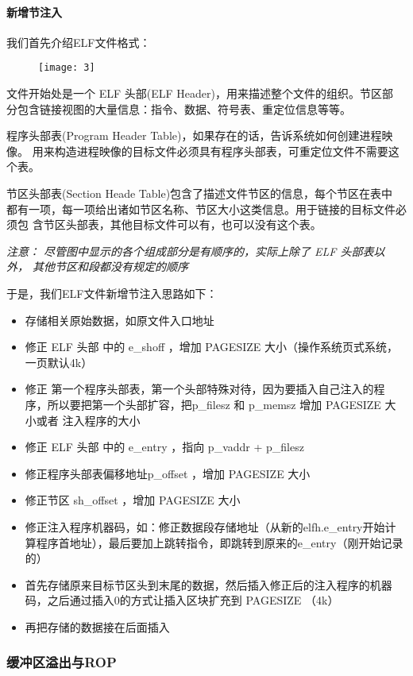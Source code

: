 \documentclass{whureport}
\begin{document}
\paragraph{新增节注入}
我们首先介绍ELF文件格式：

\begin{figure}[H]
\centering
\texttt{[image: 3]}
\end{figure}

文件开始处是一个 ELF 头部(ELF Header)，用来描述整个文件的组织。节区部 分包含链接视图的大量信息：指令、数据、符号表、重定位信息等等。

程序头部表(Program Header Table)，如果存在的话，告诉系统如何创建进程映像。 用来构造进程映像的目标文件必须具有程序头部表，可重定位文件不需要这个表。

节区头部表(Section Heade Table)包含了描述文件节区的信息，每个节区在表中 都有一项，每一项给出诸如节区名称、节区大小这类信息。用于链接的目标文件必须包 含节区头部表，其他目标文件可以有，也可以没有这个表。

\textit{注意： 尽管图中显示的各个组成部分是有顺序的，实际上除了 ELF 头部表以外， 其他节区和段都没有规定的顺序}


于是，我们ELF文件新增节注入思路如下：
\begin{itemize}
  \item 存储相关原始数据，如原文件入口地址
  \item 修正 ELF 头部 中的 e\_shoff ，增加 PAGESIZE 大小（操作系统页式系统，一页默认4k）
  \item 修正 第一个程序头部表，第一个头部特殊对待，因为要插入自己注入的程序，所以要把第一个头部扩容，把p\_filesz 和 p\_memsz 增加 PAGESIZE 大小或者 注入程序的大小
  \item 修正 ELF 头部 中的 e\_entry ，指向 p\_vaddr + p\_filesz
  \item 修正程序头部表偏移地址p\_offset ，增加 PAGESIZE 大小
  \item 修正节区 sh\_offset ，增加 PAGESIZE 大小
  \item 修正注入程序机器码，如：修正数据段存储地址（从新的elfh.e\_entry开始计算程序首地址），最后要加上跳转指令，即跳转到原来的e\_entry（刚开始记录的）
  \item 首先存储原来目标节区头到末尾的数据，然后插入修正后的注入程序的机器码，之后通过插入0的方式让插入区块扩充到 PAGESIZE （4k）
  \item 再把存储的数据接在后面插入
\end{itemize}

\subsubsection{缓冲区溢出与ROP}
\end{document}
